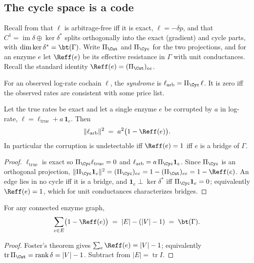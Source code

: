 \subsection{The cycle space is a code}\label{eng:S6.2}

Recall from \cite{vtok} that $\ell$ is arbitrage-free iff it is exact,
$\ell = -\delta p$, and that $C^1 = \operatorname{im}\delta \oplus
\ker\delta^\ast$ splits orthogonally into the exact (gradient) and cycle
parts, with $\dim\ker\delta^\ast = \bt(\Gamma)$. Write $\Pi_{\Cut}$ and
$\Pi_{\Cyc}$ for the two projections, and for an enzyme $e$ let $\Reff(e)$
be its effective resistance in $\Gamma$ with unit conductances. Recall the
standard identity $\Reff(e) = (\Pi_{\Cut})_{ee}$.

\begin{definition}[Syndrome]\label{eng:syndrome}
For an observed log-rate cochain $\ell$, the \emph{syndrome} is
$\ell_{\mathrm{arb}} = \Pi_{\Cyc}\,\ell$. It is zero iff the observed rates
are consistent with some price list.
\end{definition}

\begin{theorem}\label{eng:thm:detect}
Let the true rates be exact and let a single enzyme $e$ be corrupted by
$a$ in log-rate, $\ell = \ell_{\mathrm{true}} + a\,\mathbf{1}_e$. Then
\[
  \| \ell_{\mathrm{arb}} \|^2 \;=\; a^2\bigl(1 - \Reff(e)\bigr).
\]
In particular the corruption is undetectable iff $\Reff(e) = 1$ iff $e$ is
a bridge of $\Gamma$.
\end{theorem}

\begin{proof}
$\ell_{\mathrm{true}}$ is exact so $\Pi_{\Cyc}\ell_{\mathrm{true}} = 0$ and
$\ell_{\mathrm{arb}} = a\,\Pi_{\Cyc}\mathbf{1}_e$. Since $\Pi_{\Cyc}$ is an
orthogonal projection,
$\|\Pi_{\Cyc}\mathbf{1}_e\|^2 = (\Pi_{\Cyc})_{ee} = 1 - (\Pi_{\Cut})_{ee}
= 1 - \Reff(e)$. An edge lies in no cycle iff it is a bridge, and
$\mathbf{1}_e \perp \ker\delta^\ast$ iff $\Pi_{\Cyc}\mathbf{1}_e = 0$;
equivalently $\Reff(e) = 1$, which for unit conductances characterizes
bridges.
\end{proof}

\begin{theorem}\label{eng:thm:foster}
For any connected enzyme graph,
\[
  \sum_{e \in E} \bigl(1 - \Reff(e)\bigr)
  \;=\; |E| - (|V| - 1) \;=\; \bt(\Gamma).
\]
\end{theorem}

\begin{proof}
Foster's theorem \cite{foster} gives $\sum_e \Reff(e) = |V| - 1$;
equivalently $\operatorname{tr}\Pi_{\Cut} = \operatorname{rank}\delta =
|V|-1$. Subtract from $|E| = \operatorname{tr} I$.
\end{proof}

